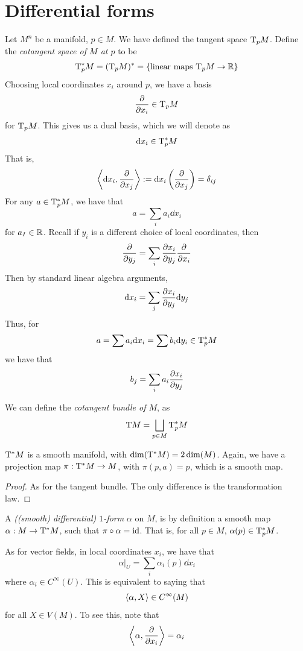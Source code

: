 \documentclass{article}
\begin{document}
\section{Differential forms}

Let \(M^n\) be a manifold, \(p \in M\). We have defined the tangent space \(\mathrm{T}_pM\). Define the \emph{cotangent space of \(M\) at \(p\)} to be
\[\mathrm{T}_p^*M = (\mathrm{T}_pM)^* = \left\{\text{linear maps } \mathrm{T}_pM \to \mathbb{R}\right\}\]
Choosing local coordinates \(x_i\) around \(p\), we have a basis
\[\pdv{x_i} \in \mathrm{T}_pM\]
for \(\mathrm{T}_pM\). This gives us a dual basis, which we will denote as
\[\dd x_i \in \mathrm{T}_p^*M\]
That is,
\[\left\langle \dd x_i, \pdv{x_j} \right\rangle := \dd x_i\left(\pdv{x_j}\right) = \delta_{ij}\]
For any \(a \in \mathrm{T}_p^*M\), we have that
\[a = \sum_i a_i \dd x_i\]
for \(a_I \in \mathbb{R}\). Recall if \(y_i\) is a different choice of local coordinates, then
\[\pdv{y_j} = \sum_i \pdv{x_i}{y_j}\pdv{x_i}\]
Then by standard linear algebra arguments,
\[\dd x_i = \sum_j \pdv{x_i}{y_j}\dd y_j\]
Thus, for
\[a = \sum a_i \dd x_i = \sum b_i \dd y_i \in \mathrm{T}_p^*M\]
we have that
\[b_j = \sum_i a_i \pdv{x_i}{y_j}\]

We can define the \emph{cotangent bundle of \(M\)}, as
\[\mathrm{T} M = \bigsqcup_{p \in M}\mathrm{T}_p^* M\]

\begin{theorem}
    \(\mathrm{T}^* M\) is a smooth manifold, with \(\dim(\mathrm{T}^* M) = 2\dim(M)\). Again, we have a projection map \(\pi : \mathrm{T}^* M \to M\), with \(\pi(p, a) = p\), which is a smooth map.
\end{theorem}

\begin{proof}
    As for the tangent bundle. The only difference is the transformation law.
\end{proof}

\begin{definition}
     A \emph{((smooth) differential) \(1\)-form} \(\alpha\) on \(M\), is by definition a smooth map \(\alpha : M \to \mathrm{T}^* M\), such that \(\pi \circ \alpha = \operatorname{id}\). That is, for all \(p \in M\), \(\alpha(p) \in \mathrm{T}_p^*M\).
\end{definition}

As for vector fields, in local coordinates \(x_i\), we have that
\[\alpha\vert_U = \sum_i \alpha_i(p)\dd x_i\]
where \(\alpha_i \in C^\infty(U)\). This is equivalent to saying that
\[\left\langle \alpha, X \right\rangle \in C^\infty(M)\]
for all \(X \in V(M)\). To see this, note that
\[\left\langle \alpha, \pdv{x_i} \right\rangle = \alpha_i\]
\end{document}
